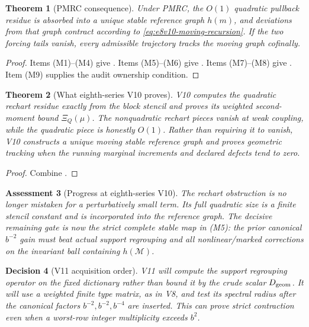 \documentclass[11pt,oneside]{book}
\newtheorem{theorem}{Theorem}[chapter]
\newtheorem{assessment}[theorem]{Assessment}
\newtheorem{decision}[theorem]{Decision}
\theoremstyle{definition}
\theoremstyle{remark}
\begin{document}
\begin{theorem}[PMRC consequence]
\label{thm:e8v10-card}
Under PMRC, the \(O(1)\) quadratic pullback residue is absorbed into a
unique stable reference graph \(h(m)\), and deviations from that graph
contract according to \eqref{eq:e8v10-moving-recursion}.  If the two
forcing tails vanish, every admissible trajectory tracks the moving
graph cofinally.
\end{theorem}

\begin{proof}
Items (M1)--(M4) give
.  Items
(M5)--(M6) give .  Items (M7)--(M8)
give .  Item (M9) supplies
the audit ownership condition.
\end{proof}

\begin{theorem}[What eighth-series V10 proves]
\label{thm:e8v10-result}
V10 computes the quadratic rechart residue exactly from the block
stencil and proves its weighted second-moment bound
\(\Xi_Q(\mu)\).  The nonquadratic rechart pieces vanish at weak
coupling, while the quadratic piece is honestly \(O(1)\).  Rather
than requiring it to vanish, V10 constructs a unique moving stable
reference graph and proves geometric tracking when the running
marginal increments and declared defects tend to zero.
\end{theorem}

\begin{proof}
Combine
.
\end{proof}

\begin{assessment}[Progress at eighth-series V10]
\label{ass:e8v10-status}
The rechart obstruction is no longer mistaken for a perturbatively
small term.  Its full quadratic size is a finite stencil constant and
is incorporated into the reference graph.  The decisive remaining
gate is now the strict complete stable map in (M5): the prior
canonical \(b^{-2}\) gain must beat actual support regrouping and all
nonlinear/marked corrections on the invariant ball containing
\(h({\mathcal M})\).
\end{assessment}

\begin{decision}[V11 acquisition order]
\label{dec:e8v10-V11}
V11 will compute the support regrouping operator on the fixed
dictionary rather than bound it by the crude scalar
\(D_{\rm geom}\).  It will use a weighted finite type matrix, as in
V8, and test its spectral radius after the canonical factors
\(b^{-2},b^{-2},b^{-4}\) are inserted.  This can prove strict
contraction even when a worst-row integer multiplicity exceeds
\(b^2\).
\end{decision}
\end{document}
